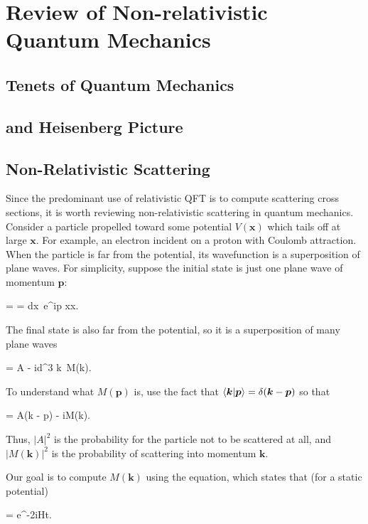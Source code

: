 \chapter{Review of Non-relativistic Quantum Mechanics}
\label{app:quantum}

\section{Tenets of Quantum Mechanics}

\section{\Schrodinger and Heisenberg Picture}

\section{Non-Relativistic Scattering}

Since the predominant use of relativistic QFT is to compute scattering cross sections, it is worth reviewing non-relativistic scattering in quantum mechanics. Consider a particle propelled toward some potential $V(\bm x)$ which tails off at large $\bm x$. For example, an electron incident on a proton with Coulomb attraction. When the particle is far from the potential, its wavefunction is a superposition of plane waves. For simplicity, suppose the initial state is just one plane wave of momentum $\bm p$:
\begin{e}
   =  = \int dx\, e^{i\bm p \cdot x}\ket x.
  \label{eqn:non-rel-scattering-initial}
\end{e}
The final state is also far from the potential, so it is a superposition of many plane waves
\begin{e}
   = A  - i\int d^3 \bm k\,  M(\bm k).
  \label{eqn:non-rel-scattering-final}
\end{e}
To understand what $M(\bm p)$ is, use the fact that $\braket{\bm k|\bm p} = \delta(\bm k - \bm p)$ so that
\begin{e}
   = A\delta(\bm k - \bm p) - iM(\bm k).
  \label{eqn:non-rel-scattering-m-def}
\end{e}
Thus, $|A|^2$ is the probability for the particle not to be scattered at all, and $|M(\bm k)|^2$ is the probability of scattering into momentum $\bm k$.

Our goal is to compute $M(\bm k)$ using the \Schrodinger equation, which states that (for a static potential)
\begin{e}
   = e^{-2iHt}.
  \label{eqn:non-rel-scattering-schrodinger}
\end{e}

